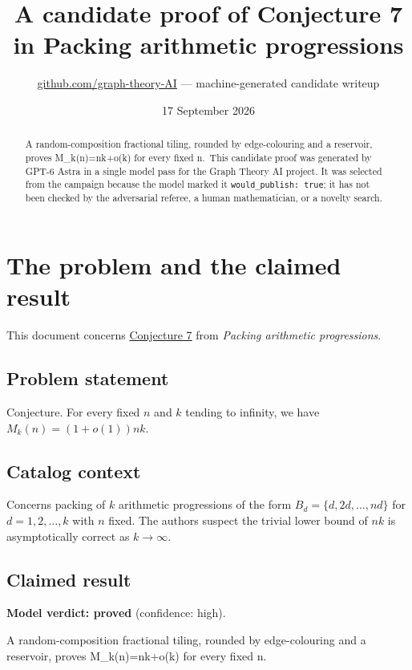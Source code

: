 \documentclass[
  11pt,
  a4paper,
]{article}
\title{A candidate proof of Conjecture 7 in Packing arithmetic
progressions}
\author{\href{https://github.com/graph-theory-AI}{github.com/graph-theory-AI}
--- machine-generated candidate writeup}
\date{17 September 2026}
\begin{document}
\maketitle
\begin{abstract}
A random-composition fractional tiling, rounded by edge-colouring and a
reservoir, proves M\_k(n)=nk+o(k) for every fixed n.~This candidate
proof was generated by GPT-6 Astra in a single model pass for the Graph
Theory AI project. It was selected from the campaign because the model
marked it \texttt{would\_publish:\ true}; it has not been checked by the
adversarial referee, a human mathematician, or a novelty search.
\end{abstract}

\section{The problem and the claimed
result}\label{the-problem-and-the-claimed-result}

This document concerns
\href{https://graph-theory-ai.github.io/graph-conjectures/arxiv/2603.02786__04/}{Conjecture
7} from \emph{Packing arithmetic progressions}.

\subsection{Problem statement}\label{problem-statement}

Conjecture. For every fixed \(n\) and \(k\) tending to infinity, we have
\(M_{k}(n)=(1+o(1))nk\).

\subsection{Catalog context}\label{catalog-context}

Concerns packing of \(k\) arithmetic progressions of the form
\(B_d=\{d,2d,\ldots,nd\}\) for \(d=1,2,\ldots,k\) with \(n\) fixed. The
authors suspect the trivial lower bound of \(nk\) is asymptotically
correct as \(k\to\infty\).

\subsection{Claimed result}\label{claimed-result}

\textbf{Model verdict: proved} (confidence: high).

A random-composition fractional tiling, rounded by edge-colouring and a
reservoir, proves M\_k(n)=nk+o(k) for every fixed n.
\end{document}
